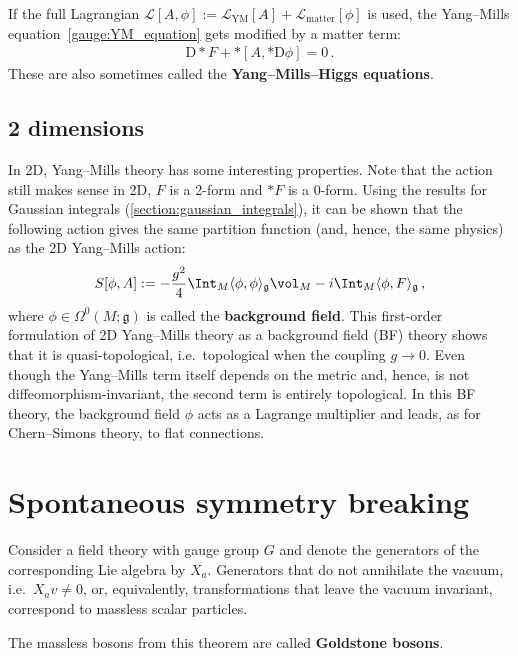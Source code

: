     If the full Lagrangian $\mathcal{L}[A,\phi]:=\mathcal{L}_{\text{YM}}[A]+\mathcal{L}_{\text{matter}}[\phi]$ is used, the Yang--Mills equation~\eqref{gauge:YM_equation} gets modified by a matter term:
    \begin{gather}
        \mathrm{D}\ast F + \ast[A,\ast\mathrm{D}\phi]=0\,.
    \end{gather}
    These are also sometimes called the \textbf{Yang--Mills--Higgs equations}.


\subsection{2 dimensions}

    In 2D, Yang--Mills theory has some interesting properties. Note that the action still makes sense in 2D, $F$ is a 2-form and $\ast F$ is a 0-form. Using the results for Gaussian integrals (\cref{section:gaussian_integrals}), it can be shown that the following action gives the same partition function (and, hence, the same physics) as the 2D Yang--Mills action:
    \begin{gather}
        S[\phi,A] := -\frac{g^2}{4}\Int_M\langle\phi,\phi\rangle_{\mathfrak{g}}\vol_M-i\Int_M\langle\phi,F\rangle_{\mathfrak{g}}\,,
    \end{gather}
    where $\phi\in\Omega^0(M;\mathfrak{g})$ is called the \textbf{background field}. This first-order formulation of 2D Yang--Mills theory as a background field (BF) theory shows that it is quasi-topological, i.e.~topological when the coupling $g\longrightarrow0$. Even though the Yang--Mills term itself depends on the metric and, hence, is not diffeomorphism-invariant, the second term is entirely topological. In this BF theory, the background field $\phi$ acts as a Lagrange multiplier and leads, as for Chern--Simons theory, to flat connections.

\section{Spontaneous symmetry breaking}

    \begin{theorem}[Goldstone]
        Consider a field theory with gauge group $G$ and denote the generators of the corresponding Lie algebra by $X_a$. Generators that do not annihilate the vacuum, i.e.~$X_av\neq0$, or, equivalently, transformations that leave the vacuum invariant, correspond to massless scalar particles.
    \end{theorem}
    The massless bosons from this theorem are called \textbf{Goldstone bosons}.

